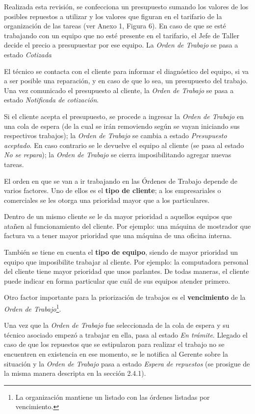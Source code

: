 \documentclass[12pt]{extarticle}
\begin{document}
\begin{spacing}{1.2}
    Realizada esta revisión, se confecciona un presupuesto sumando los valores de los posibles repuestos a utilizar y los valores que figuran en el tarifario de la organización de las tareas (ver Anexo 1, Figura 6). En caso de que se esté trabajando con un equipo que no esté presente en el tarifario, el Jefe de Taller decide el precio a presupuestar por ese equipo. La \textit{Orden de Trabajo} se pasa a estado \textit{Cotizada}
    
    El técnico se contacta con el cliente para informar el diagnóstico del equipo, si va a ser posible una reparación, y en caso de que lo sea, un presupuesto del trabajo. Una vez comunicado el presupuesto al cliente, la \textit{Orden de Trabajo} se pasa a estado \textit{Notificada de cotización}. 
    
    Si el cliente acepta el presupuesto, se procede a ingresar la \textit{Orden de Trabajo} en una cola de espera (de la cual se irán removiendo según se vayan iniciando sus respectivos trabajos); la \textit{Orden de Trabajo} se cambia a estado \textit{Presupuesto aceptado}. En caso contrario se le devuelve el equipo al cliente (se pasa al estado \textit{No se repara}); la \textit{Orden de Trabajo} se cierra imposibilitando agregar nuevas tareas.

    El orden en que se van a ir trabajando en las Órdenes de Trabajo depende de varios factores. Uno de ellos es el \textbf{tipo de cliente}; a los empresariales o comerciales se les otorga una prioridad mayor que a los particulares.

    Dentro de un mismo cliente se le da mayor prioridad a aquellos equipos que atañen al funcionamiento del cliente. Por ejemplo: una máquina de mostrador que factura va a tener mayor prioridad que una máquina de una oficina interna.

    También se tiene en cuenta el \textbf{tipo de equipo}, siendo de mayor prioridad un equipo que imposibilite trabajar al cliente. Por ejemplo: la computadora personal del cliente tiene mayor prioridad que unos parlantes.
    De todas maneras, el cliente puede indicar en forma particular que cuál de sus equipos atender primero.

    Otro factor importante para la priorización de trabajos es el \textbf{vencimiento} de la \textit{Orden de Trabajo}\footnote{La organización mantiene un listado con las órdenes listadas por vencimiento.}. 
    
    Una vez que la \textit{Orden de Trabajo} fue seleccionada de la cola de espera y su técnico asociado empezó a trabajar en ella, pasa al estado \textit{En trámite}. Llegado el caso de que los repuestos que se estipularon para realizar el trabajo no se encuentren en existencia en ese momento, se le notifica al Gerente sobre la situación y la \textit{Orden de Trabajo} pasa a estado \textit{Espera de repuestos} (se prosigue de la misma manera descripta en la sección 2.4.1).


\end{spacing}
\end{document}
